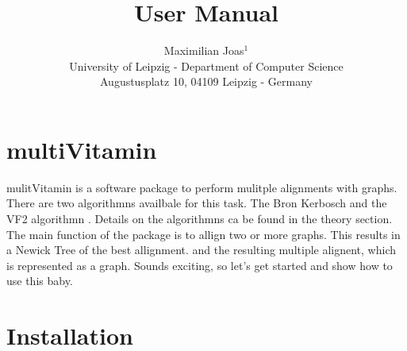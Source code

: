 \documentclass{SeminarV2}
\begin{document}
\title{User Manual}

\author{Maximilian Joas$^1$
%
%
\vspace{.3cm}\\
%
University of Leipzig  - Department of Computer Science \\
Augustusplatz 10, 04109 Leipzig  - Germany\\}

%


\maketitle

\begin{abstract}


\end{abstract}

\section{multiVitamin}
mulitVitamin is a software package to perform mulitple alignments with graphs.
There are two algorithmns availbale for this task. The Bron Kerbosch \cite{}
and the VF2 algorithmn \cite{}. Details on the algorithmns ca be found in the
theory section.\\
The main function of the package is to allign two or more graphs. This results
in a Newick Tree of the best allignment. and the resulting multiple alignent, which
is represented as a graph.
\cite{}  Sounds exciting, so let's
get started and show how to use this baby.

\section{Installation}
\end{document}
